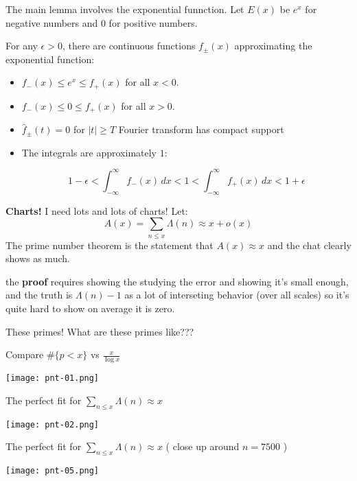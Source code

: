 \documentclass[12pt]{article}
\begin{document}
\newpage

\noindent The main lemma involves the exponential funnction.  Let $E(x)$ be $e^x$ for negative numbers and $0$ for positive numbers. \newline

\noindent For any $\epsilon > 0$, there are continuous functions $f_\pm (x)$ approximating the exponential function:
\begin{itemize}
\item $f_-(x) \leq e^x \leq f_+(x)$ for all $x  < 0$.
\item $f_-(x) \leq 0 \leq f_+(x)$ \hspace{0.40em}for all $x  > 0$.
\item $\hat{f}_\pm(t) = 0$ for $|t| \geq T$ Fourier transform has compact support
\item The integrals are approximately $1$:


$$1 - \epsilon < 
\int_{-\infty}^\infty f_-(x) \, dx  <
1  <  
 \int_{-\infty}^\infty f_+(x) \, dx < 1 + \epsilon $$
\end{itemize}

\newpage

\noindent \textbf{Charts!}  I need lots and lots of charts! Let: 
$$ A(x) = \sum_{n \leq x} \Lambda(n) \approx x + o(x)$$
The prime number theorem is the statement that $A(x) \approx x$ and the chat clearly shows as much. \newline

\noindent the \textbf{proof} requires showing the studying the error and showing it's small enough, and the truth is $\Lambda(n) - 1$ as a lot of interseting behavior (over all scales) so it's quite hard to show on average it is zero. \newline

\noindent These primes! What are these primes like???

\newpage

\noindent Compare $\# \{ p < x\}$ vs $\frac{x}{\log x}$

\texttt{[image: pnt-01.png]}
 
\newpage

The perfect fit for $\sum_{n \leq x} \Lambda(n) \approx x$

\texttt{[image: pnt-02.png]}

\newpage

The perfect fit for $\sum_{n \leq x} \Lambda(n) \approx x$ ( close up around $n = 7500$ )

\texttt{[image: pnt-05.png]}
\end{document}
